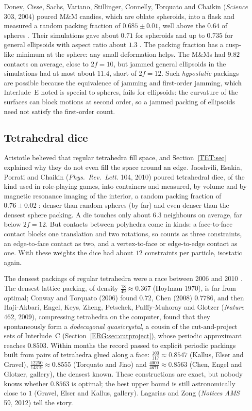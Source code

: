Donev, Cisse, Sachs, Variano, Stillinger, Connelly, Torquato and Chaikin (\emph{Science} 303, 2004) poured
M\&M candies, which are oblate spheroids, into a flask and measured a random packing fraction of
$0.685\pm0.01$, well above the $0.64$ of spheres . Their simulations gave about $0.71$ for
spheroids and up to $0.735$ for general ellipsoids with aspect ratio about $1.3$ .
The packing fraction has a cusp-like minimum at the sphere: any small deformation helps. The M\&Ms had
$9.82$ contacts on average, close to $2f=10$, but jammed general ellipsoids in the simulations had at most
about $11.4$, short of $2f=12$. Such \emph{hypostatic} packings are possible because the equivalence of jamming and first-order jamming,
which Interlude~E noted is special to spheres, fails for ellipsoids: the curvature of the surfaces can
block motions at second order, so a jammed packing of ellipsoids need not satisfy the first-order count.

\subsection*{Tetrahedral dice}
Aristotle believed that regular tetrahedra fill space, and Section~\ref{TET:sec} explained why they do not
even fill the space around an edge. Jaoshvili, Esakia, Porrati and Chaikin (\emph{Phys.\ Rev.\ Lett.} 104,
2010) poured tetrahedral dice, of the kind used in role-playing games, into containers and
measured, by volume and by magnetic resonance imaging of the interior, a random packing fraction of
$0.76\pm0.02$ : denser than random spheres (by far) and even denser than the densest
sphere packing. A die touches only about $6.3$ neighbours on average, far below $2f=12$. But contacts between
polyhedra come in kinds: a face-to-face contact blocks one translation and two rotations, so counts as three
constraints, an edge-to-face contact as two, and a vertex-to-face or edge-to-edge contact as one. With these
weights the dice had about $12$ constraints per particle, isostatic again.

The densest packings of regular tetrahedra were a race between 2006 and 2010 . The densest
lattice packing, of density $\frac{18}{49}\approx0.367$ (Hoylman 1970), is far from optimal; Conway and
Torquato (2006) found $0.72$, Chen (2008) $0.7786$, and then Haji-Akbari, Engel, Keys, Zheng, Petschek, Palffy-Muhoray and
Glotzer (\emph{Nature} 462, 2009), compressing tetrahedra on the computer, found that they
spontaneously form a \emph{dodecagonal quasicrystal}, a cousin of the cut-and-project sets of Interlude~C
(Section~\ref{ERG:sec:cutproject}), whose periodic approximant reaches $0.8503$. Within months the record
passed to explicit periodic packings built from pairs of tetrahedra glued along a face: $\frac{100}{117}\approx0.8547$
(Kallus, Elser and Gravel), $\frac{12250}{14319}\approx0.8555$ (Torquato and Jiao) and
$\frac{4000}{4671}\approx0.8563$ (Chen, Engel and Glotzer, gallery), the densest known. These constructions are exact,
but nobody knows whether $0.8563$ is optimal; the best upper bound is still astronomically close to $1$
(Gravel, Elser and Kallus, gallery). Lagarias and Zong (\emph{Notices AMS} 59, 2012) tell the story.

